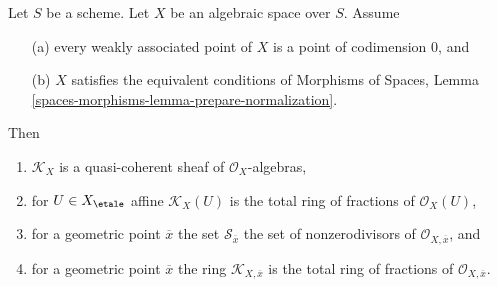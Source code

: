 \begin{lemma}
\label{lemma-meromorphic-quasi-coherent}
Let $S$ be a scheme. Let $X$ be an algebraic space over $S$. Assume
\begin{enumerate}
\item[(a)] every weakly associated point of $X$
is a point of codimension $0$, and
\item[(b)] $X$ satisfies the equivalent conditions
of Morphisms of Spaces, Lemma
\ref{spaces-morphisms-lemma-prepare-normalization}.
\end{enumerate}
Then
\begin{enumerate}
\item $\mathcal{K}_X$ is a quasi-coherent sheaf of $\mathcal{O}_X$-algebras,
\item for $U \in X_\etale$ affine $\mathcal{K}_X(U)$
is the total ring of fractions of $\mathcal{O}_X(U)$,
\item for a geometric point $\overline{x}$ the set
$\mathcal{S}_{\overline{x}}$
the set of nonzerodivisors of $\mathcal{O}_{X, \overline{x}}$, and
\item for a geometric point $\overline{x}$ the ring
$\mathcal{K}_{X, \overline{x}}$ is the total ring of fractions of
$\mathcal{O}_{X, \overline{x}}$.
\end{enumerate}
\end{lemma}

